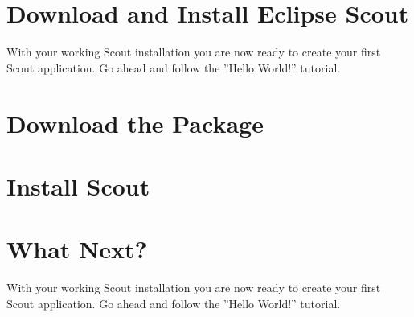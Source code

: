 \documentclass{article}
\begin{document}
\section*{Download and Install Eclipse Scout}

With your working Scout installation you are now ready to create your first Scout application. 
Go ahead and follow the ''Hello World!'' tutorial.

\section*{Download the Package}

\section*{Install Scout}


\section*{What Next?}

With your working Scout installation you are now ready to create your first Scout application. 
Go ahead and follow the ''Hello World!'' tutorial.
\end{document}
